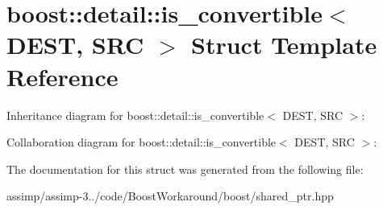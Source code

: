 \hypertarget{structboost_1_1detail_1_1is__convertible}{\section{boost\+:\+:detail\+:\+:is\+\_\+convertible$<$ D\+E\+S\+T, S\+R\+C $>$ Struct Template Reference}
\label{structboost_1_1detail_1_1is__convertible}
}


Inheritance diagram for boost\+:\+:detail\+:\+:is\+\_\+convertible$<$ D\+E\+S\+T, S\+R\+C $>$\+:


Collaboration diagram for boost\+:\+:detail\+:\+:is\+\_\+convertible$<$ D\+E\+S\+T, S\+R\+C $>$\+:


The documentation for this struct was generated from the following file\+:\begin{DoxyCompactItemize}
\item 
assimp/assimp-\/3../code/\+Boost\+Workaround/boost/shared\+\_\+ptr.\+hpp\end{DoxyCompactItemize}
